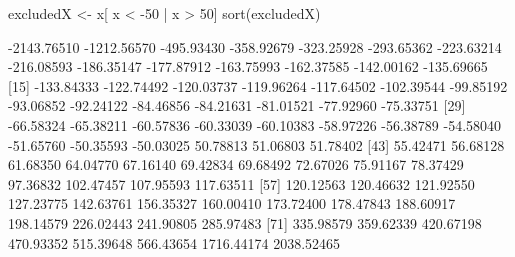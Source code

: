 \begin{Schunk}
\begin{Sinput}
  excludedX <- x[ x < -50 | x > 50]
  sort(excludedX)
\end{Sinput}
\begin{Soutput}
 [1] -2143.76510 -1212.56570  -495.93430  -358.92679  -323.25928  -293.65362  -223.63214  -216.08593  -186.35147  -177.87912  -163.75993  -162.37585  -142.00162  -135.69665
[15]  -133.84333  -122.74492  -120.03737  -119.96264  -117.64502  -102.39544   -99.85192   -93.06852   -92.24122   -84.46856   -84.21631   -81.01521   -77.92960   -75.33751
[29]   -66.58324   -65.38211   -60.57836   -60.33039   -60.10383   -58.97226   -56.38789   -54.58040   -51.65760   -50.35593   -50.03025    50.78813    51.06803    51.78402
[43]    55.42471    56.68128    61.68350    64.04770    67.16140    69.42834    69.68492    72.67026    75.91167    78.37429    97.36832   102.47457   107.95593   117.63511
[57]   120.12563   120.46632   121.92550   127.23775   142.63761   156.35327   160.00410   173.72400   178.47843   188.60917   198.14579   226.02443   241.90805   285.97483
[71]   335.98579   359.62339   420.67198   470.93352   515.39648   566.43654  1716.44174  2038.52465
\end{Soutput}
\end{Schunk}
